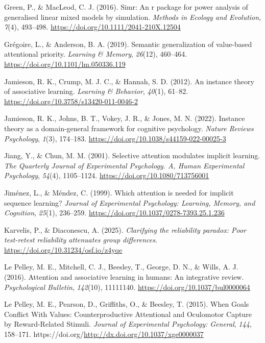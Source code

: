 \documentclass[
  man,
  floatsintext,
  longtable,
  nolmodern,
  notxfonts,
  notimes,
  colorlinks=true,linkcolor=blue,citecolor=blue,urlcolor=blue]{apa7}
\newlength{\cslhangindent}
\newenvironment{CSLReferences}[2] %
 {\begin{list}{}{%
  \setlength{\itemindent}{0pt}
  \setlength{\leftmargin}{0pt}
  \setlength{\parsep}{0pt}
  \ifodd #1
   \setlength{\leftmargin}{\cslhangindent}
   \setlength{\itemindent}{-1\cslhangindent}
  \fi
  \setlength{\itemsep}{#2\baselineskip}}}
 {\end{list}}
\begin{document}
\begin{CSLReferences}{1}{0}
Green, P., \& MacLeod, C. J. (2016). Simr: An r package for power
analysis of generalised linear mixed models by simulation. \emph{Methods
in Ecology and Evolution}, \emph{7}(4), 493--498.
\url{https://doi.org/10.1111/2041-210X.12504}

Grégoire, L., \& Anderson, B. A. (2019). Semantic generalization of
value-based attentional priority. \emph{Learning \& Memory},
\emph{26}(12), 460--464. \url{https://doi.org/10.1101/lm.050336.119}

Jamieson, R. K., Crump, M. J. C., \& Hannah, S. D. (2012). An instance
theory of associative learning. \emph{Learning \& Behavior},
\emph{40}(1), 61--82. \url{https://doi.org/10.3758/s13420-011-0046-2}

Jamieson, R. K., Johns, B. T., Vokey, J. R., \& Jones, M. N. (2022).
Instance theory as a domain-general framework for cognitive psychology.
\emph{Nature Reviews Psychology}, \emph{1}(3), 174--183.
\url{https://doi.org/10.1038/s44159-022-00025-3}

Jiang, Y., \& Chun, M. M. (2001). Selective attention modulates implicit
learning. \emph{The Quarterly Journal of Experimental Psychology. A,
Human Experimental Psychology}, \emph{54}(4), 1105--1124.
\url{https://doi.org/10.1080/713756001}

Jiménez, L., \& Méndez, C. (1999). Which attention is needed for
implicit sequence learning? \emph{Journal of Experimental Psychology:
Learning, Memory, and Cognition}, \emph{25}(1), 236--259.
\url{https://doi.org/10.1037/0278-7393.25.1.236}

Karvelis, P., \& Diaconescu, A. (2025). \emph{Clarifying the reliability
paradox: Poor test-retest reliability attenuates group differences}.
\url{https://doi.org/10.31234/osf.io/z4yqe}

Le Pelley, M. E., Mitchell, C. J., Beesley, T., George, D. N., \& Wills,
A. J. (2016). Attention and associative learning in humans: An
integrative review. \emph{Psychological Bulletin}, \emph{142}(10),
11111140. \url{https://doi.org/10.1037/bul0000064}

Le Pelley, M. E., Pearson, D., Griffiths, O., \& Beesley, T. (2015).
When Goals Conflict With Values: Counterproductive Attentional and
Oculomotor Capture by Reward-Related Stimuli. \emph{Journal of
Experimental Psychology: General}, \emph{144}, 158--171.
https://doi.org/\url{http://dx.doi.org/10.1037/xge0000037}


\end{CSLReferences}
\end{document}

